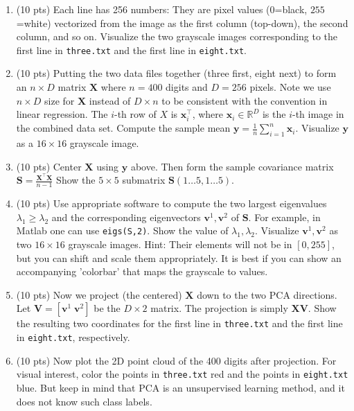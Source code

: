 \documentclass[a4paper]{article}
\theoremstyle{definition}
\def\R{\mathbb R}
\renewcommand\vec[1]{\mathbf{#1}}
\begin{document}
\begin{enumerate}
    \item  (10 pts) Each line has 256 numbers: They are pixel values ($0$=black, $255$=white) vectorized from the image as the first column (top-down), the second column, and so on. Visualize the two grayscale images corresponding to the first line in {\tt three.txt} and the first line in {\tt eight.txt}. 
\item (10 pts) Putting the two data files together (three first, eight next) to form an $n\times D$ matrix $\vec X$ where $n = 400$ digits and $D = 256$ pixels. Note we use $n \times D$ size for $\vec X$ instead of $D \times n$ to be consistent with the convention in linear regression. The $i$-th row of $X$ is $\vec x_i^\top$, where $\vec x_i\in\R^D$ is the $i$-th image in the 
combined data set. Compute the sample mean $\vec y=\frac{1}{n}\sum_{i=1}^n \vec x_i$. Visualize $\vec y$ as a $16\times 16$ grayscale image. 
\item (10 pts) Center $\vec X$ using $\vec y$ above. Then form the sample covariance matrix $\vec S=\frac{\vec X^\top \vec X}{n-1}$ Show the $5\times 5$ submatrix $\vec S(1\ldots 5,1\ldots 5)$.

\item (10 pts) Use appropriate software to compute the two largest eigenvalues $\lambda_1\geq \lambda_2$ and the corresponding eigenvectors $\vec v^1,\vec v^2$ of $\vec S$. For example, in Matlab one can use {\tt eigs(S,2)}. Show the value of $\lambda_1,\lambda_2$. Visualize $\vec v^1,\vec v^2$  as two $16\times 16$ grayscale images. Hint: Their elements will not be in $[0, 255]$, but you can shift and scale them appropriately. It is best if you can show an accompanying 'colorbar' that maps the grayscale to values. 
\item (10 pts) Now we project (the centered) $\vec X$ down to the two PCA directions. Let $\vec V = [\vec v^1\; \vec v^2]$ be the $D\times 2$ matrix. The projection is simply $\vec X\vec V$. Show the resulting two coordinates for the first line in {\tt three.txt} and the first line in {\tt eight.txt}, respectively. 
\item (10 pts) Now plot the 2D point cloud of the 400 digits after projection. For visual interest, color the points in {\tt three.txt} red and the points in {\tt eight.txt} blue. But keep in mind that PCA is an unsupervised learning method, and it does not know such class labels. 
\end{enumerate}
\end{document}

